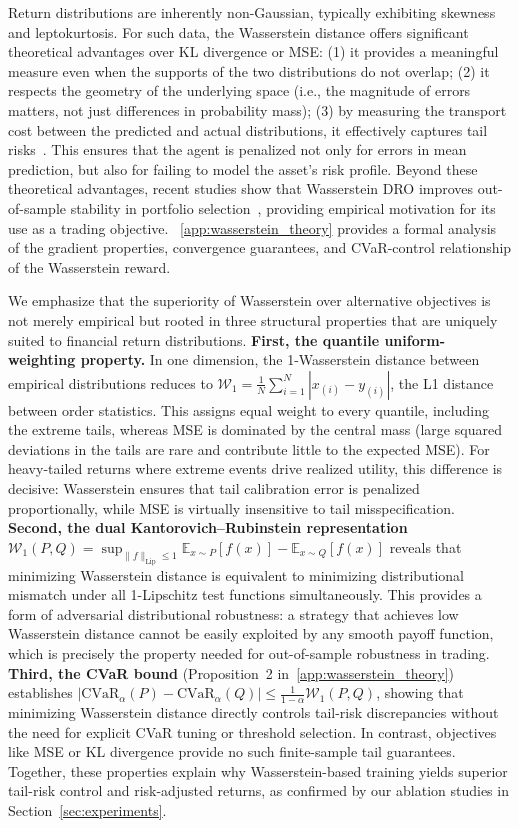 Return distributions are inherently non-Gaussian, typically exhibiting skewness and leptokurtosis. For such data, the Wasserstein distance offers significant theoretical advantages over KL divergence or MSE: (1) it provides a meaningful measure even when the supports of the two distributions do not overlap; (2) it respects the geometry of the underlying space (i.e., the magnitude of errors matters, not just differences in probability mass); (3) by measuring the transport cost between the predicted and actual distributions, it effectively captures tail risks~\cite{villani2009optimal,peyre2019computational}. This ensures that the agent is penalized not only for errors in mean prediction, but also for failing to model the asset's risk profile. Beyond these theoretical advantages, recent studies show that Wasserstein DRO improves out-of-sample stability in portfolio selection~\cite{pesenti2023pOrtfolio,nguyen2025robustifying}, providing empirical motivation for its use as a trading objective. ~\ref{app:wasserstein_theory} provides a formal analysis of the gradient properties, convergence guarantees, and CVaR-control relationship of the Wasserstein reward.

We emphasize that the superiority of Wasserstein over alternative objectives is not merely empirical but rooted in three structural properties that are uniquely suited to financial return distributions. \textbf{First, the quantile uniform-weighting property.} In one dimension, the 1-Wasserstein distance between empirical distributions reduces to $\mathcal{W}_1 = \frac{1}{N}\sum_{i=1}^N |x_{(i)} - y_{(i)}|$, the L1 distance between order statistics. This assigns equal weight to every quantile, including the extreme tails, whereas MSE is dominated by the central mass (large squared deviations in the tails are rare and contribute little to the expected MSE). For heavy-tailed returns where extreme events drive realized utility, this difference is decisive: Wasserstein ensures that tail calibration error is penalized proportionally, while MSE is virtually insensitive to tail misspecification. \textbf{Second, the dual Kantorovich--Rubinstein representation} $\mathcal{W}_1(P,Q) = \sup_{\|f\|_{\text{Lip}} \leq 1} \mathbb{E}_{x\sim P}[f(x)] - \mathbb{E}_{x\sim Q}[f(x)]$ reveals that minimizing Wasserstein distance is equivalent to minimizing distributional mismatch under all 1-Lipschitz test functions simultaneously. This provides a form of adversarial distributional robustness: a strategy that achieves low Wasserstein distance cannot be easily exploited by any smooth payoff function, which is precisely the property needed for out-of-sample robustness in trading. \textbf{Third, the CVaR bound} (Proposition~2 in~\ref{app:wasserstein_theory}) establishes $|\text{CVaR}_\alpha(P) - \text{CVaR}_\alpha(Q)| \leq \frac{1}{1-\alpha}\mathcal{W}_1(P,Q)$, showing that minimizing Wasserstein distance directly controls tail-risk discrepancies without the need for explicit CVaR tuning or threshold selection. In contrast, objectives like MSE or KL divergence provide no such finite-sample tail guarantees. Together, these properties explain why Wasserstein-based training yields superior tail-risk control and risk-adjusted returns, as confirmed by our ablation studies in Section~\ref{sec:experiments}.

